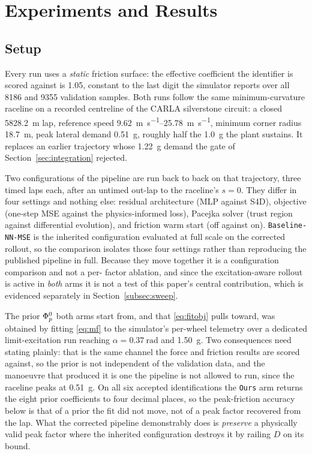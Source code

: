 \section{Experiments and Results}
\label{sec:results}

\subsection{Setup}
\label{subsec:setup}

Every run uses a \emph{static} friction surface: the effective coefficient the
identifier is scored against is \num{1.05}, constant to the last digit the
simulator reports over all \num{8186} and \num{9355} validation samples. Both
runs follow the same minimum-curvature raceline on a recorded centreline of
the CARLA silverstone circuit: a closed \SI{5828.2}{\meter} lap, reference
speed \SIrange{9.62}{25.78}{\meter\per\second}, minimum corner radius
\SI{18.7}{\meter}, peak lateral demand \SI{0.51}{\g}, roughly half the
\SI{1.0}{\g} the plant sustains. It replaces an earlier trajectory whose
\SI{1.22}{\g} demand the gate of Section~\ref{sec:integration} rejected.

Two configurations of the pipeline are run back to back on that trajectory,
three timed laps each, after an untimed out-lap to the raceline's $s=0$. They
differ in four settings and nothing else: residual architecture (MLP against
S4D), objective (one-step MSE against the physics-informed loss), Pacejka
solver (trust region against differential evolution), and friction warm start
(off against on). \texttt{Baseline-NN-MSE} is the inherited configuration
evaluated at full scale on the corrected rollout, so the comparison isolates
those four settings rather than reproducing the published pipeline in full.
Because they move together it is a configuration comparison and not a per-
factor ablation, and since the excitation-aware rollout is active in
\emph{both} arms it is not a test of this paper's central contribution, which
is evidenced separately in Section~\ref{subsec:sweep}.

The prior $\Phi_{p}^{0}$ both arms start from, and that \eqref{eq:fitobj} pulls
toward, was obtained by fitting \eqref{eq:mf} to the simulator's per-wheel
telemetry over a dedicated limit-excitation run reaching
$\alpha=\SI{0.37}{\radian}$ and \SI{1.50}{\g}. Two consequences need stating
plainly: that is the same channel the force and friction results are scored
against, so the prior is not independent of the validation data, and the
manoeuvre that produced it is one the pipeline is not allowed to run, since the
raceline peaks at \SI{0.51}{\g}. On all six accepted identifications the
\texttt{Ours} arm returns the eight prior coefficients to four decimal places,
so the peak-friction accuracy below is that of a prior the fit did not move,
not of a peak factor recovered from the lap. What the corrected pipeline
demonstrably does is \emph{preserve} a physically valid peak factor where the
inherited configuration destroys it by railing $D$ on its bound.

